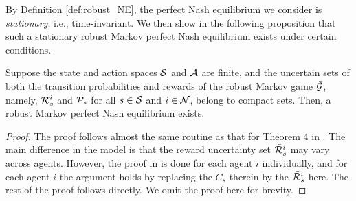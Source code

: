 By Definition \ref{def:robust_NE}, the perfect Nash equilibrium we consider is \emph{stationary}, i.e., time-invariant.  
We then show in the following proposition that 
such a stationary robust Markov perfect Nash equilibrium  exists under certain conditions.

\begin{proposition}\label{prop:exist_NE}
	Suppose the state and action spaces ${\mathcal{S}}$ and $\mathcal{A}$ are finite, 
	and the uncertain sets of both the transition probabilities and rewards of the robust Markov game $\bar{\mathcal{G}}$, namely, $\bar{\mathcal{R}}^i_{s}$ and $\bar{\mathcal{P}}_s$ for all $s\in{\mathcal{S}}$ and $i\in\mathcal{N}$, belong to compact sets. Then, a robust Markov perfect Nash equilibrium exists. 
\end{proposition}
\begin{proof}
	The proof follows almost the same routine as that for Theorem $4$ in \citep{kardecs2011discounted}. The main difference in the model is that the reward uncertainty set $\bar{\mathcal{R}}^i_{s}$ may vary across agents. However, the proof in \citep{kardecs2011discounted} is done for each agent $i$ individually, and for each agent $i$ the argument holds by replacing the $C_s$ therein by the $\bar{\mathcal{R}}^i_{s}$ here. The rest of the proof follows directly. We omit the proof here for brevity. 
\end{proof}



